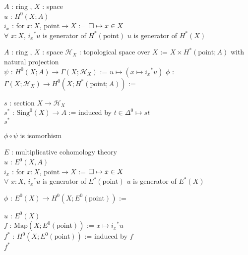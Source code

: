\documentclass[dvipdfmx]{jsarticle}
\begin{document}
\begin{Theorem}
\itemwhen
  \For \(A\) : ring , \(X\) : space \\
  \For \(u\) : \(H^0(X;A)\) \\
  \Let \(i_x\) : for \(x:X\), \(\text{point} \to X\) := \(\square \mapsto x \in X\) \\
  \IfHold \(\forall\) \(x:X\), \({i_x}^* u\) is generator of \(H^*(\text{point})\)
\itemprop
  \Then \(u\) is generator of \(H^*(X)\)
\end{Theorem}

\begin{Theorem}
\itemwhen
  \For \(A\) : ring , \(X\) : space
\itemdefi
  \Define \(\mathcal{H}_{X}\) : topological space over \(X\) := \(X \times H^*(\text{point}; A)\) with natural projection \\
  \Define \(\psi\) : \(H^0(X;A) \to \Gamma(X;\mathcal{H}_{X})\) := \(u \mapsto (x \mapsto {i_x}^{*}u)\)
\itemdefi
  \Define \(\phi\) : \(\Gamma(X; \mathcal{H}_X) \to H^0(X;H^*(\text{point};A))\) :=
  \begin{indentblock}
    \For \(s\) : section \(X \to \mathcal{H}_X\) \\
    \Let \(s^*\) : \(\text{Sing}^{0}(X) \to A\) := induced by \(t \in \Delta^0 \mapsto st\) \\
    \Return \(s^*\)
  \end{indentblock}
\itemprop
  \Then \(\phi \circ \psi\) is isomorhism \\
\end{Theorem}

\begin{Theorem}
\itemwhen
  \For \(E\) : multiplicative cohomology theory \\
  \For \(u\) : \(E^0(X,A)\) \\
  \Let \(i_x\) : for \(x:X\), \(\text{point} \to X\) := \(\square \mapsto x \in X\) \\
  \IfHold \(\forall\) \(x:X\), \({i_x}^* u\) is generator of \(E^{*}(\text{point})\)
\itemprop
  \Then \(u\) is generator of \(E^*(X)\)
\end{Theorem}

\begin{Theorem}
\itemdefi
  \Define \(\phi\) : \(E^{0}(X) \to H^0(X;E^{0}(\text{point}))\) :=
  \begin{indentblock}
    \For \(u\) : \(E^{0}(X)\) \\
    \Let \(f\) : \(\text{Map}(X; E^0(\text{point}))\) := \(x \mapsto {i_x}^*u\) \\
    \Let \(f^*\) : \(H^{0}(X; E^{0}(\text{point}))\) := induced by \(f\) \\
    \Return \(f^*\)
  \end{indentblock}
\itemprop
\end{Theorem}
\end{document}
